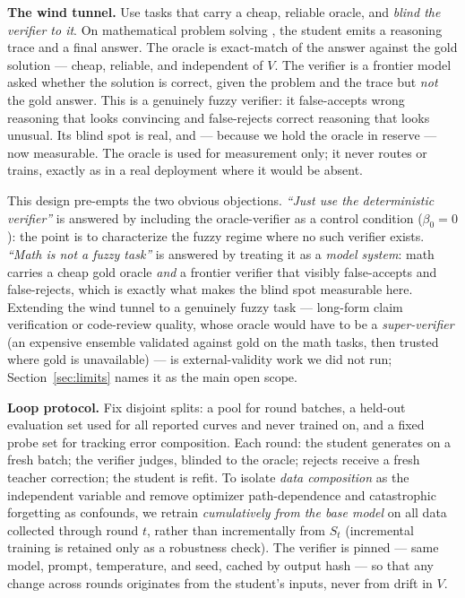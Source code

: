 \documentclass[11pt]{article}
\begin{document}
\textbf{The wind tunnel.} Use tasks that carry a cheap, reliable oracle,
and \emph{blind the verifier to it}. On mathematical problem solving
\cite{hendrycks2021math,cobbe2021gsm8k}, the student emits a
reasoning trace and a final answer. The oracle is exact-match of the
answer against the gold solution --- cheap, reliable, and independent of
\(V\). The verifier is a frontier model asked whether the solution is
correct, given the problem and the trace but \emph{not} the gold answer.
This is a genuinely fuzzy verifier: it false-accepts wrong reasoning
that looks convincing and false-rejects correct reasoning that looks
unusual. Its blind spot is real, and --- because we hold the oracle in
reserve --- now measurable. The oracle is used for measurement only; it
never routes or trains, exactly as in a real deployment where it would
be absent.

This design pre-empts the two obvious objections. \emph{``Just use the
deterministic verifier''} is answered by including the oracle-verifier
as a control condition (\(\beta_{0} = 0\)): the point is to characterize
the fuzzy regime where no such verifier exists. \emph{``Math is not a
fuzzy task''} is answered by treating it as a \emph{model system}: math
carries a cheap gold oracle \emph{and} a frontier verifier that visibly
false-accepts and false-rejects, which is exactly what makes the blind
spot measurable here. Extending the wind tunnel to a genuinely fuzzy
task --- long-form claim verification or code-review quality, whose
oracle would have to be a \emph{super-verifier} (an expensive ensemble
validated against gold on the math tasks, then trusted where gold is
unavailable) --- is external-validity work we did not run;
Section~\ref{sec:limits} names it as the main open scope.

\textbf{Loop protocol.} Fix disjoint splits: a pool for round batches, a
held-out evaluation set used for all reported curves and never trained
on, and a fixed probe set for tracking error composition. Each round:
the student generates on a fresh batch; the verifier judges, blinded to
the oracle; rejects receive a fresh teacher correction; the student is
refit. To isolate \emph{data composition} as the independent variable
and remove optimizer path-dependence and catastrophic forgetting as
confounds, we retrain \emph{cumulatively from the base model} on all
data collected through round \(t\), rather than incrementally from
\(S_{t}\) (incremental training is retained only as a robustness check).
The verifier is pinned --- same model, prompt, temperature, and seed,
cached by output hash --- so that any change across rounds originates
from the student's inputs, never from drift in \(V\).
\end{document}
